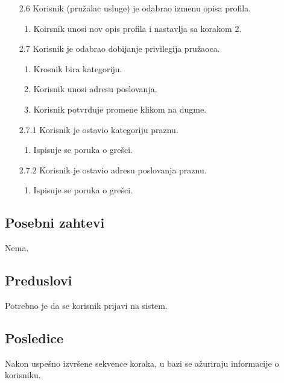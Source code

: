 \documentclass[a4paper,12pt]{report}
\begin{document}
\begin{enumerate}
        \item[2.6] Korisnik (pružalac usluge) je odabrao izmenu opisa profila.
         \begin{enumerate}[noitemsep,topsep=-8pt]
        \item Koirsnik unosi nov opis profila i nastavlja sa korakom 2.
        \end{enumerate}
        
        \item[2.7] Korisnik je odabrao dobijanje privilegija pružaoca.
         \begin{enumerate}[noitemsep,topsep=-8pt]
        \item Krosnik bira kategoriju.
        \item Korisnik unosi adresu poslovanja.
        \item Korisnik potvrđuje promene klikom na dugme.
         \end{enumerate}
         
        \item[2.7.1] Korisnik je ostavio kategoriju praznu.
        \begin{enumerate}[noitemsep,topsep=-8pt]
        \item Ispisuje se poruka o grešci.
        \end{enumerate}
        
        \item[2.7.2] Korisnik je ostavio adresu poslovanja praznu.
        \begin{enumerate}[noitemsep,topsep=-8pt]
        \item Ispisuje se poruka o grešci.
        \end{enumerate}
        
    \end{enumerate}
    
\subsection{Posebni zahtevi}
    Nema.
\subsection{Preduslovi}
    Potrebno je da se korisnik prijavi na sistem. 
\subsection{Posledice}
    Nakon uspešno izvršene sekvence koraka, u bazi se ažuriraju informacije o korisniku.
\end{document}
